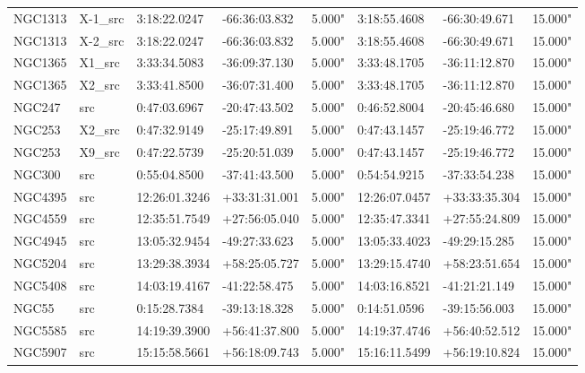 \begin{tabular}{llllllll}
           NGC1313 &     X-1\_src &  3:18:22.0247 & -66:36:03.832 &     5.000" &  3:18:55.4608 & -66:30:49.671 &    15.000" \\
           NGC1313 &     X-2\_src &  3:18:22.0247 & -66:36:03.832 &     5.000" &  3:18:55.4608 & -66:30:49.671 &    15.000" \\
           NGC1365 &      X1\_src &  3:33:34.5083 & -36:09:37.130 &     5.000" &  3:33:48.1705 & -36:11:12.870 &    15.000" \\
           NGC1365 &      X2\_src &  3:33:41.8500 & -36:07:31.400 &     5.000" &  3:33:48.1705 & -36:11:12.870 &    15.000" \\
            NGC247 &         src &  0:47:03.6967 & -20:47:43.502 &     5.000" &  0:46:52.8004 & -20:45:46.680 &    15.000" \\
            NGC253 &      X2\_src &  0:47:32.9149 & -25:17:49.891 &     5.000" &  0:47:43.1457 & -25:19:46.772 &    15.000" \\
            NGC253 &      X9\_src &  0:47:22.5739 & -25:20:51.039 &     5.000" &  0:47:43.1457 & -25:19:46.772 &    15.000" \\
            NGC300 &         src &  0:55:04.8500 & -37:41:43.500 &     5.000" &  0:54:54.9215 & -37:33:54.238 &    15.000" \\
           NGC4395 &         src & 12:26:01.3246 & +33:31:31.001 &     5.000" & 12:26:07.0457 & +33:33:35.304 &    15.000" \\
           NGC4559 &         src & 12:35:51.7549 & +27:56:05.040 &     5.000" & 12:35:47.3341 & +27:55:24.809 &    15.000" \\
           NGC4945 &         src & 13:05:32.9454 & -49:27:33.623 &     5.000" & 13:05:33.4023 & -49:29:15.285 &    15.000" \\
           NGC5204 &         src & 13:29:38.3934 & +58:25:05.727 &     5.000" & 13:29:15.4740 & +58:23:51.654 &    15.000" \\
           NGC5408 &         src & 14:03:19.4167 & -41:22:58.475 &     5.000" & 14:03:16.8521 & -41:21:21.149 &    15.000" \\
             NGC55 &         src &  0:15:28.7384 & -39:13:18.328 &     5.000" &  0:14:51.0596 & -39:15:56.003 &    15.000" \\
           NGC5585 &         src & 14:19:39.3900 & +56:41:37.800 &     5.000" & 14:19:37.4746 & +56:40:52.512 &    15.000" \\
           NGC5907 &         src & 15:15:58.5661 & +56:18:09.743 &     5.000" & 15:16:11.5499 & +56:19:10.824 &    15.000" \\

\end{tabular}

